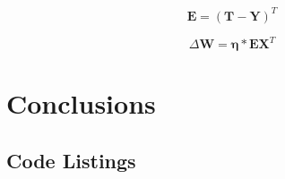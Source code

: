 \documentclass{ecsarticle}     %
\begin{document}
\begin{equation}	
	\mathbf{E} = (\mathbf{T} - \mathbf{Y})^{T}
	\label{eqn:slp_learn_2}
\end{equation}

\begin{equation}	
	\Delta \mathbf{W} = \mathbf{\eta}*\mathbf{E}\mathbf{X}^T
	\label{eqn:slp_learn_3}
\end{equation}





\section{Conclusions}


\newpage






\backmatter
\begin{appendix}

\newpage
\section{Code Listings}

\end{appendix}

\end{document}
